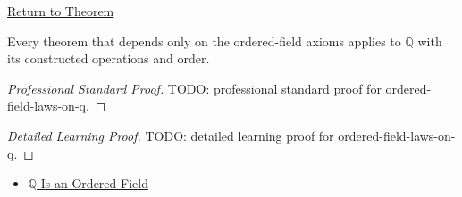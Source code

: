 \newpage
{}
\label{prf:ordered-field-laws-on-q}

\begin{remark*}[Return]
\hyperref[cor:ordered-field-laws-on-q]{Return to Theorem}
\end{remark*}

\begin{corollary*}
Every theorem that depends only on the ordered-field axioms applies to
$\mathbb{Q}$ with its constructed operations and order.
\end{corollary*}

\begin{proof}[Professional Standard Proof]
\LRAProofBodyStart
TODO: professional standard proof for ordered-field-laws-on-q.
\end{proof}

\begin{proof}[Detailed Learning Proof]
\LRAProofBodyStart
TODO: detailed learning proof for ordered-field-laws-on-q.
\end{proof}

\begin{remark*}
\end{remark*}

\begin{dependencies}
\begin{itemize}
  \item \hyperref[thm:q-is-an-ordered-field]{$\mathbb{Q}$ Is an Ordered Field}
\end{itemize}
\end{dependencies}

\clearpage
